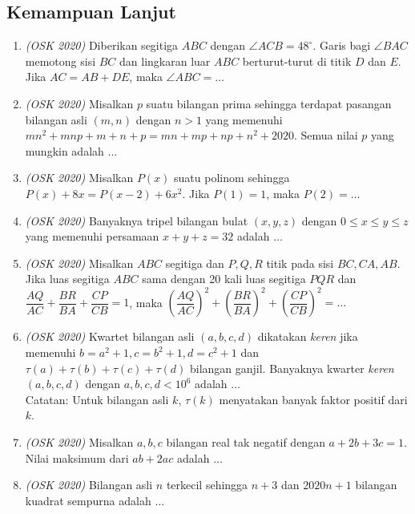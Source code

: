 \subsection{Kemampuan Lanjut}
\begin{enumerate}
	\item \textit{(OSK 2020)} Diberikan segitiga $ABC$ dengan $\angle ACB = 48^\circ$. Garis bagi $\angle BAC$ memotong sisi $BC$ dan lingkaran luar $ABC$ berturut-turut di titik $D$ dan $E$. Jika  $AC = AB+DE$, maka $\angle ABC = \dots$
	
	\item \textit{(OSK 2020)} Misalkan $p$ suatu bilangan prima sehingga terdapat pasangan bilangan asli $(m,n)$ dengan  $n > 1$ yang memenuhi $mn^2+mnp+m+n+p = mn+mp+np+n^2+2020$. Semua nilai $p$ yang mungkin adalah $\dots$
	
	\item \textit{(OSK 2020)} Misalkan $P(x)$ suatu polinom sehingga $P(x)+8x=P(x-2)+6x^2$. Jika $P(1)=1$, maka $P(2)=\dots$
	
	\item \textit{(OSK 2020)} Banyaknya tripel bilangan bulat $(x,y,z)$ dengan $0 \leq x \leq y \leq z$ yang memenuhi persamaan $x+y+z = 32$ adalah $\dots$
	
	\item \textit{(OSK 2020)} Misalkan $ABC$ segitiga dan $P,Q,R$ titik pada sisi $BC,CA,AB$. Jika luas segitiga $ABC$ sama dengan 20 kali luas segitiga $PQR$ dan $\dfrac{AQ}{AC}+\dfrac{BR}{BA}+\dfrac{CP}{CB} = 1$, maka $\left(\dfrac{AQ}{AC}\right)^2+\left(\dfrac{BR}{BA}\right)^2+\left(\dfrac{CP}{CB}\right)^2 = \dots$
	
	\item \textit{(OSK 2020)} Kwartet bilangan asli $(a,b,c,d)$ dikatakan \textit{keren} jika memenuhi $b = a^2+1,c = b^2+1,d = c^2+1$ dan $\tau(a)+\tau(b)+\tau(c)+\tau(d)$ bilangan ganjil. Banyaknya kwarter \textit{keren} $(a,b,c,d)$ dengan $a,b,c,d < 10^6$ adalah $\dots$
	\\
	Catatan: Untuk bilangan asli $k$, $\tau(k)$ menyatakan banyak faktor positif dari $k$.
	
	\item \textit{(OSK 2020)} Misalkan $a,b,c$ bilangan real tak negatif dengan $a+2b+3c = 1$. Nilai maksimum dari $ab+2ac$ adalah $\dots$
	
	\item \textit{(OSK 2020)} Bilangan asli $n$ terkecil sehingga  $n+3$ dan $2020n+1$ bilangan kuadrat sempurna adalah $\dots$
	

\end{enumerate}

